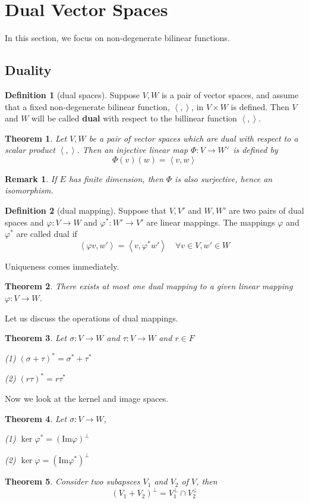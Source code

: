 \documentclass{book}
\newtheorem{theorem}{Theorem}[section]
\newtheorem*{remark}{Remark}
\theoremstyle{definition}
\newtheorem{definition}{Definition}[section]
\begin{document}
\section{Dual Vector Spaces}
In this section, we focus on non-degenerate bilinear functions.
\subsection{Duality}
\begin{definition}[dual spaces]
Suppose $V,W$ is a pair of vector spaces, and assume that a fixed non-degenerate bilinear function, $\left\langle,\right\rangle$, in $V\times W$ is defined. Then $V$ and $W$ will be called \textbf{dual} with respect to the billinear function $\left\langle,\right\rangle$. 
\end{definition}
\begin{theorem}\label{general dual v.s. special dual}
Let $V,W$ be a pair of vector spaces which are dual with respect to a scalar product $\left\langle,\right\rangle$. Then an injective linear map $\Phi : V \longrightarrow W^\vee$ is defined by \[\Phi(v)(w)=\left\langle v,w\right\rangle\]
\end{theorem}
\begin{remark}
If $E$ has finite dimension, then $\Phi$ is also surjective, hence an isomorphism.
\end{remark}

\begin{definition}[dual mapping]
Suppose that $V,V'$ and $W,W'$ are two pairs of dual spaces and $\varphi:V\to W$ and $\varphi^*:W'\to V'$ are linear mappings. The mappings $\varphi$ and $\varphi^*$ are called dual if \[\left\langle \varphi v,w'\right\rangle=\left\langle v,\varphi^* w'\right\rangle \quad \forall v\in V,w'\in W\]
\end{definition}
Uniqueness comes immediately.
\begin{theorem}
There exists at most one dual mapping to a given linear mapping $\varphi:V\to W$.
\end{theorem}
Let us discuss the operations of dual mappings.
\begin{theorem}
Let $\sigma:V\to W$ and $\tau:V\to W$ and $r\in F$\par
(1) $(\sigma+\tau)^*=\sigma^*+\tau^*$\par
(2) $(r\tau)^*=r\tau^*$
\end{theorem}
Now we look at the kernel and image spaces.
\begin{theorem}
Let $\sigma:V\to W$,\par
(1) $\ker \varphi^*=(\text{Im}\varphi)^\perp$ \par
(2) $\ker \varphi=(\text{Im}\varphi^*)^\perp $
\end{theorem}
\begin{theorem}
Consider two subapsces $V_1$ and $V_2$ of $V$, then \[ (V_1+V_2)^\perp=V_1^\perp\cap V_2^\perp\]
\end{theorem}
\end{document}
